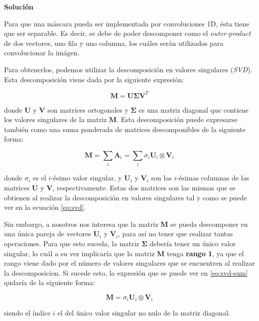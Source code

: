 \documentclass[11pt,a4paper]{article}
\newcommand{\answer}{\noindent\textbf{Solución}}
\begin{document}
\answer

Para que una máscara pueda ser implementada por convoluciones 1D, ésta tiene que ser separable. Es decir, se debe de poder
descomponer como el \textit{outer-product} de dos vectores, uno fila y uno columna, los cuáles serán utilizados para
convolucionar la imágen.

Para obtenerlos, podemos utilizar la descomposición en valores singulares (\textit{SVD}). Esta descomposición viene dada
por la siguiente expresión:

\begin{equation}
\label{eq:svd}
	\mathbf{M} = \mathbf{U} \mathbf{\Sigma} \mathbf{V}^T
\end{equation}

\noindent donde $\mathbf{U}$ y $\mathbf{V}$ son matrices ortogonales y $\mathbf{\Sigma}$ es una matriz diagonal que contiene
los valores singulares de la matriz $\mathbf{M}$. Esta descomposición puede expresarse también como una suma ponderada de
matrices descomponibles de la siguiente forma:

\begin{equation}
\label{eq:svd-sum}
	\mathbf{M} = \sum_i \mathbf{A}_i = \sum_i \sigma_i \mathbf{U}_i \otimes \mathbf{V}_i
\end{equation}

\noindent donde $\sigma_i$ es el $i$-ésimo valor singular, y $\mathbf{U}_i$ y $\mathbf{V}_i$ son las $i$-ésimas columnas
de las matrices $\mathbf{U}$ y $\mathbf{V}$, respectivamente. Estas dos matrices son las mismas que se obtienen al realizar
la descomposición en valores singulares tal y como se puede ver en la ecuación \eqref{eq:svd}.

Sin embargo, a nosotros nos interesa que la matriz $\mathbf{M}$ se pueda descomponer en una única pareja de vectores
$\mathbf{U}_i$ y $\mathbf{V}_i$, para así no tener que realizar tantas operaciones. Para que esto suceda,
la matriz $\mathbf{\Sigma}$ debería tener un único valor singular, lo cuál a su vez implicaría que la matriz $\mathbf{M}$
tenga \textbf{rango 1}, ya que el rango viene dado por el número de valores singulares que se encuentren al realizar la
descomposicion. Si sucede esto, la expresión que se puede ver en \eqref{eq:svd-sum} qudaría de la siguiente forma:

\begin{equation}
	\mathbf{M} = \sigma_i \mathbf{U}_i \otimes \mathbf{V}_i
\end{equation}

\noindent siendo el índice $i$ el del único valor singular no nulo de la matriz diagonal.
\end{document}

